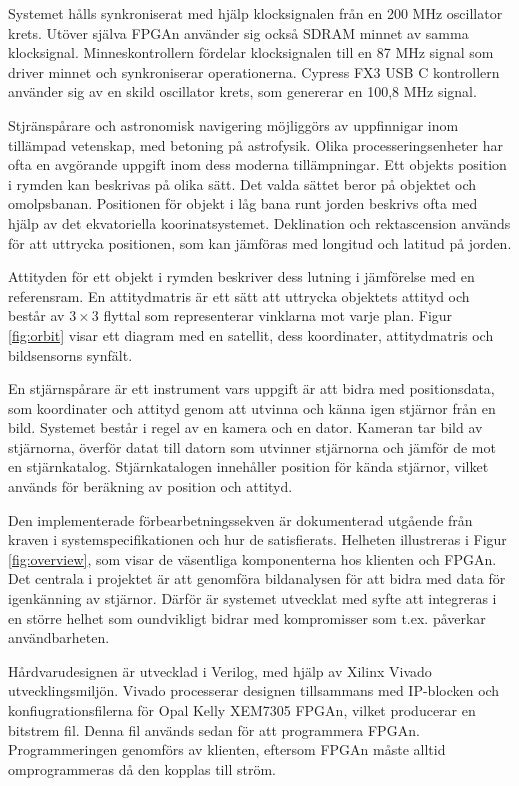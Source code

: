 \documentclass[12pt]{report}
\begin{document}
\par
Systemet hålls synkroniserat med hjälp klocksignalen från en 200 MHz oscillator krets. Utöver själva FPGAn använder sig också SDRAM minnet av samma klocksignal. Minneskontrollern fördelar klocksignalen till en 87 MHz signal som driver minnet och synkroniserar operationerna. Cypress FX3 USB C kontrollern använder sig av en skild oscillator krets, som genererar en 100,8 MHz signal. \citep{XEM7305Man}
\par
Stjränspårare och astronomisk navigering möjliggörs av uppfinnigar inom tillämpad vetenskap, med betoning på astrofysik. Olika processeringsenheter har ofta en avgörande uppgift inom dess moderna tillämpningar. Ett objekts position i rymden kan beskrivas på olika sätt. Det valda sättet beror på objektet och omolpsbanan. Positionen för objekt i låg bana runt jorden beskrivs ofta med hjälp av det ekvatoriella koorinatsystemet. Deklination och rektascension används för att uttrycka positionen, som kan jämföras med longitud och latitud på jorden. \citep{SatDesgin}
\par
Attityden för ett objekt i rymden beskriver dess lutning i jämförelse med en referensram. En attitydmatris är ett sätt att uttrycka objektets attityd och består av $3\times3$ flyttal som representerar vinklarna mot varje plan. Figur \ref{fig:orbit} visar ett diagram med en satellit, dess koordinater, attitydmatris och bildsensorns synfält. \citep{StRef}
\par
En stjärnspårare är ett instrument vars uppgift är att bidra med positionsdata, som koordinater och attityd genom att utvinna och känna igen stjärnor från en bild. Systemet består i regel av en kamera och en dator. Kameran tar bild av stjärnorna, överför datat till datorn som utvinner stjärnorna och jämför de mot en stjärnkatalog. Stjärnkatalogen innehåller position för kända stjärnor, vilket används för beräkning av position och attityd. \citep{SatDesgin}
\par
Den implementerade förbearbetningssekven är dokumenterad utgående från kraven i systemspecifikationen och hur de satisfierats. Helheten illustreras i Figur \ref{fig:overview}, som visar de väsentliga komponenterna hos klienten och FPGAn. Det centrala i projektet är att genomföra bildanalysen för att bidra med data för igenkänning av stjärnor. Därför är systemet utvecklat med syfte att integreras i en större helhet som oundvikligt bidrar med kompromisser som t.ex. påverkar användbarheten.
\par
Hårdvarudesignen är utvecklad i Verilog, med hjälp av Xilinx Vivado utvecklingsmiljön. Vivado processerar designen tillsammans med IP-blocken och konfiugrationsfilerna för Opal Kelly XEM7305 FPGAn, vilket producerar en bitstrem fil. Denna fil används sedan för att programmera FPGAn. Programmeringen genomförs av klienten, eftersom FPGAn måste alltid omprogrammeras då den kopplas till ström.
\end{document}
